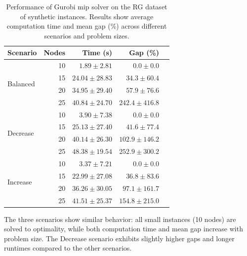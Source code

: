 \documentclass[twocolumn, switch]{article} %
\begin{document}
\begin{table}[h]
    \caption{Performance of Gurobi \gls{mip} solver on the RG dataset of synthetic instances. Results show average computation time and mean gap (\%) across different scenarios and problem sizes.}
    \label{tab:gurobi_performance}
    \centering
    \begin{tabular}{lrrrr}
        \toprule
        \textbf{Scenario} & \textbf{Nodes} & \textbf{Time (s)} & \textbf{Gap (\%)} \\
        \midrule
        \multirow{4}{*}{Balanced} & 10 & $1.89 \pm 2.81$ & $0.0 \pm 0.0$ \\
        & 15 & $24.04 \pm 28.83$ & $34.3 \pm 60.4$ \\
        & 20 & $34.95 \pm 29.40$ & $57.9 \pm 76.6$ \\
        & 25 & $40.84 \pm 24.70$ & $242.4 \pm 416.8$ \\
        \midrule
        \multirow{4}{*}{Decrease} & 10 & $3.90 \pm 7.38$ & $0.0 \pm 0.0$ \\
        & 15 & $25.13 \pm 27.40$ & $41.6 \pm 77.4$ \\
        & 20 & $40.14 \pm 26.30$ & $102.9 \pm 146.2$ \\
        & 25 & $48.38 \pm 19.54$ & $252.9 \pm 300.2$ \\
        \midrule
        \multirow{4}{*}{Increase} & 10 & $3.37 \pm 7.21$ & $0.0 \pm 0.0$ \\
        & 15 & $22.99 \pm 27.08$ & $36.8 \pm 83.6$ \\
        & 20 & $36.26 \pm 30.05$ & $97.1 \pm 161.7$ \\
        & 25 & $41.51 \pm 25.37$ & $154.8 \pm 215.0$ \\
        \bottomrule
    \end{tabular}
\end{table}

The three scenarios show similar behavior: all small instances (10 nodes) are solved to optimality, while both computation time and mean gap increase with problem size.
The Decrease scenario exhibits slightly higher gaps and longer runtimes compared to the other scenarios.
\end{document}
